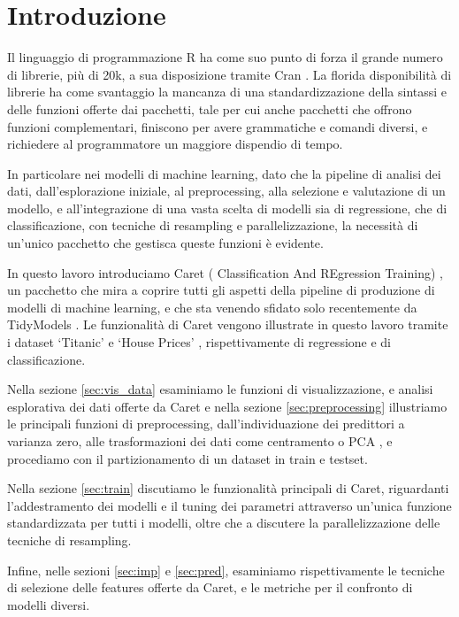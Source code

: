 \documentclass[12pt]{article}
\begin{document}
\tableofcontents

\section{Introduzione}
Il linguaggio di programmazione R ha come suo punto di forza il grande numero di librerie, più di 20k, a sua disposizione tramite Cran \cite{cit:cran}. 
La florida disponibilità di librerie ha come svantaggio la mancanza di una standardizzazione della sintassi e delle funzioni offerte dai pacchetti, tale per cui anche pacchetti che offrono funzioni complementari, 
finiscono per avere grammatiche e comandi diversi, e richiedere al programmatore un maggiore dispendio di tempo.

In particolare nei modelli di machine learning, dato che la pipeline di analisi dei dati, dall'esplorazione iniziale, al preprocessing, alla selezione e valutazione di un modello, e all'integrazione di una 
vasta scelta di modelli sia di regressione, che di classificazione, con tecniche di resampling e parallelizzazione, la necessità di un'unico pacchetto che gestisca queste funzioni è evidente. 

In questo lavoro introduciamo Caret ( Classification And REgression Training) \cite{caret:repo}, un pacchetto che mira a coprire tutti gli aspetti della pipeline di produzione di modelli di machine learning, e che sta venendo sfidato solo recentemente da TidyModels \cite{cit:tidymodels}. 
Le funzionalità di Caret vengono illustrate in questo lavoro tramite i dataset ‘Titanic’ \cite{cit:titanic} e ‘House Prices’ \cite{cit:houseprices}, rispettivamente di regressione e di classificazione.

Nella sezione \ref{sec:vis_data} esaminiamo le funzioni di visualizzazione, e analisi esplorativa dei dati offerte da Caret e nella sezione \ref{sec:preprocessing} illustriamo le principali funzioni di preprocessing, dall'individuazione 
dei predittori a varianza zero, alle trasformazioni dei dati come centramento o PCA \cite{cit:wikipca}, e procediamo con il partizionamento di un dataset in train e testset.

Nella sezione \ref{sec:train} discutiamo le funzionalità principali di Caret, riguardanti l'addestramento dei modelli e il tuning dei parametri attraverso un'unica funzione standardizzata per tutti i modelli, oltre che a 
discutere la parallelizzazione delle tecniche di resampling. 

Infine, nelle sezioni \ref{sec:imp} e \ref{sec:pred}, esaminiamo rispettivamente le tecniche di selezione delle features offerte da Caret, e le metriche per il confronto di modelli diversi.
\end{document}
